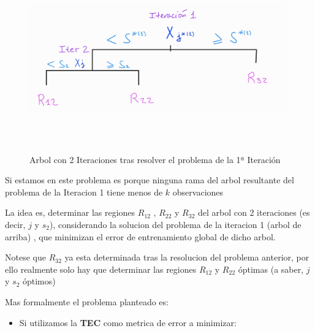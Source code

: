 \documentclass[
  11pt,
  a4paper,
]{article}
\providecommand{\tightlist}{%
  \setlength{\itemsep}{0pt}\setlength{\parskip}{0pt}}
\begin{document}
\begin{figure}
\centering
\includegraphics[width=4.375in,height=3.125in]{output_500_0.jpg}
\caption{Arbol con 2 Iteraciones tras resolver el problema de la 1ª
Iteración}
\end{figure}

\vspace{0.15cm}

Si estamos en este problema es porque ninguna rama del arbol resultante
del problema de la Iteracion 1 tiene menos de \(k\) observaciones

La idea es, determinar las regiones \(R_{12}\) , \(R_{22}\) y \(R_{32}\)
del arbol con 2 iteraciones (es decir, \(j\) y \(s_2\)), considerando la
solucion del problema de la iteracion 1 (arbol de arriba) , que
minimizan el error de entrenamiento global de dicho arbol.

Notese que \(R_{32}\) ya esta determinada tras la resolucion del
problema anterior, por ello realmente solo hay que determinar las
regiones \(R_{12}\) y \(R_{22}\) óptimas (a saber, \(j\) y \(s_2\)
óptimos)

\newpage

Mas formalmente el problema planteado es:

\begin{itemize}
\tightlist
\item
  Si utilizamos la \textbf{TEC} como metrica de error a minimizar:
\end{itemize}
\end{document}
